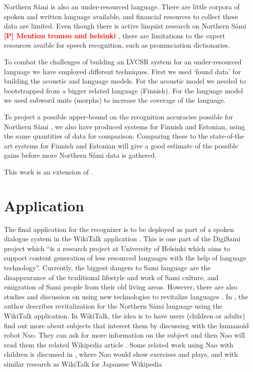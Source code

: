 \documentclass[b5paper]{article}
\newcommand{\todo}[2]{{\textcolor{red}{\bf [#1] #2 }}}
\newcommand{\ns}{{Northern Sámi }}
\begin{document}
\ns is also an under-resourced language. There are little corpora of spoken and written language available, and financial resources to collect these data are limited. Even though there is active linquist research on \ns \todo{P}{Mention tromso and helsinki}, there are limitations to the expert resources avaible for speech recognition, such as pronunciation dictionaries. 

To combat the challenges of building an LVCSR system for an under-resourced language we have employed different techniques. First we used `found data' for building the acoustic and language models. For the acoustic model we needed to bootstrapped from a bigger related language (Finnish). For the language model we used subword units (morphs) to increase the coverage of the language.

To project a possible upper-bound on the recognition accuracies possible for \ns, we also have produced systems for Finnish and Estonian, using the same quantities of data for comparison. Comparing these to the state-of-the art systems for Finnish and Estonian will give a good estimate of the possible gains before more \ns data is gathered.

This work is an extension of \cite{leinonen2015}.

\section{Application}
The final application for the recognizer is to be deployed as part of a spoken dialogue system in the WikiTalk application \cite{wilcock2013wikitalk}. This is one part of the DigiSami project which ``is a research project at University of Helsinki which aims to support content generation of less resourced languages with the help of language technology''. Currently, the biggest dangers to Sami language are the disappearance of the traditional lifestyle and work of Sami culture, and emigration of Sami people from their old living areas. However, there are also studies and discussion on using new technologies to revitalize languages \cite{eisenlohr2004language}. In \cite{jokinen2014open}, the author describes revitalization for the \ns language using the WikiTalk application. In WikiTalk, the idea is to have users (children or adults) find out more about subjects that interest them by discussing with the humanoid robot Nao. They can ask for more information on the subject and then Nao will read them the related Wikipedia article \cite{jokinen2014multimodal}. Some related work using Nao with children is discussed in \cite{kruijff2012spoken}, where Nao would show exercises and plays, and with similar research as WikiTalk for Japanese Wikipedia \cite{kobayashi2011intelligent}
\end{document}
